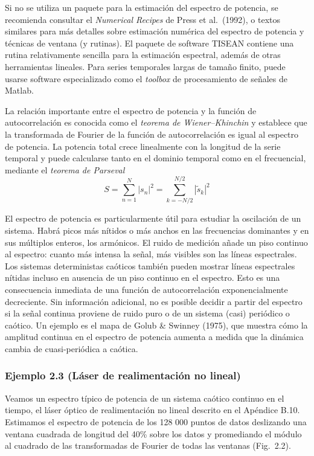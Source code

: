 \documentclass[10pt,a4paper]{book}
\begin{document}
Si no se utiliza un paquete para la estimación del espectro de potencia, se recomienda consultar el \emph{Numerical Recipes} de Press et al.~(1992), o textos similares para más detalles sobre estimación numérica del espectro de potencia y técnicas de ventana (y rutinas). El paquete de software TISEAN contiene una rutina relativamente sencilla para la estimación espectral, además de otras herramientas lineales. Para series temporales largas de tamaño finito, puede usarse software especializado como el \emph{toolbox} de procesamiento de señales de Matlab.

La relación importante entre el espectro de potencia y la función de autocorrelación es conocida como el \emph{teorema de Wiener–Khinchin} y establece que la transformada de Fourier de la función de autocorrelación es igual al espectro de potencia. La potencia total crece linealmente con la longitud de la serie temporal y puede calcularse tanto en el dominio temporal como en el frecuencial, mediante el \textit{teorema de Parseval}
\begin{equation}
S = \sum_{n=1}^N |s_n|^2 = \sum_{k=-N/2}^{N/2} |\tilde{s}_k|^2 
\end{equation}



El espectro de potencia es particularmente útil para estudiar la oscilación de un sistema. Habrá picos más nítidos o más anchos en las frecuencias dominantes y en sus múltiplos enteros, los armónicos. El ruido de medición añade un piso continuo al espectro: cuanto más intensa la señal, más visibles son las líneas espectrales. Los sistemas deterministas caóticos también pueden mostrar líneas espectrales nítidas incluso en ausencia de un piso continuo en el espectro. Esto es una consecuencia inmediata de una función de autocorrelación exponencialmente decreciente. Sin información adicional, no es posible decidir a partir del espectro si la señal continua proviene de ruido puro o de un sistema (casi) periódico o caótico. Un ejemplo es el mapa de Golub \& Swinney (1975), que muestra cómo la amplitud continua en el espectro de potencia aumenta a medida que la dinámica cambia de cuasi-periódica a caótica.

\subsubsection*{Ejemplo 2.3 (Láser de realimentación no lineal)}
Veamos un espectro típico de potencia de un sistema caótico continuo en el tiempo, el láser óptico de realimentación no lineal descrito en el Apéndice B.10. Estimamos el espectro de potencia de los 128 000 puntos de datos deslizando una ventana cuadrada de longitud del 40\% sobre los datos y promediando el módulo al cuadrado de las transformadas de Fourier de todas las ventanas (Fig.~2.2).
\end{document}
